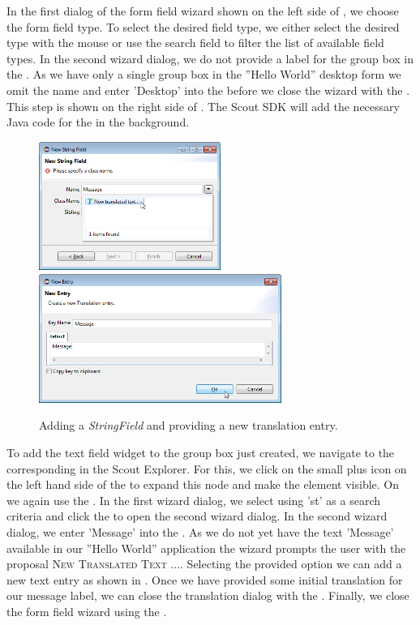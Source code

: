 \documentclass[a4paper,10pt,twoside]{book}
\begin{document}
In the first dialog of the form field wizard shown on the left side of , we choose the form field type.
To select the desired field type, we either select the desired type with the mouse or use the search field to filter the list of available field types.
In the second wizard dialog, we do not provide a label for the group box in the .
As we have only a single group box in the ''Hello World'' desktop form we omit the name and enter 'Desktop' into the  before we close the wizard with the .
This step is shown on the right side of .
The Scout SDK will add the necessary Java code for the  in the background.

\begin{figure}
\includegraphics[height=4.2cm]{sdk_new_field_stringfield_1.png} \hspace{8mm}
\includegraphics[height=4.2cm]{sdk_new_field_stringfield_2.png}
\caption{Adding a \textit{StringField} and providing a new translation entry.}
\end{figure}

To add the text field widget to the group box just created, we navigate to the corresponding  in the Scout Explorer.
For this, we click on the small plus icon on the left hand side of the  to expand this node and make the  element visible.
On  we again use the .
In the first wizard dialog, we select  using 'st' as a search criteria and click the  to open the second wizard dialog.
In the second wizard dialog, we enter 'Message' into the .
As we do not yet have the text 'Message' available in our ''Hello World'' application the wizard prompts the user with the proposal \textsc{New Translated Text ...}.
Selecting the provided option we can add a new text entry as shown in .
Once we have provided some initial translation for our message label, we can close the translation dialog with the .
Finally, we close the form field wizard using the .
\end{document}
